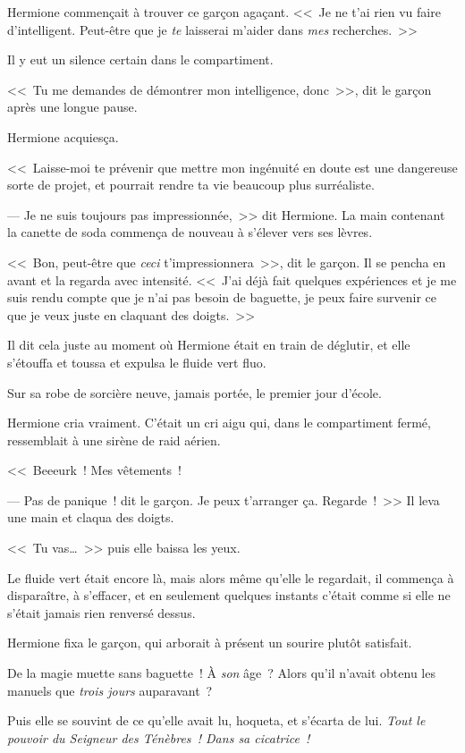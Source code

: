 Hermione commençait à trouver ce garçon agaçant. <<~Je ne t'ai rien vu faire d'intelligent. Peut-être que je \emph{te} laisserai m'aider dans \emph{mes} recherches.~>>

Il y eut un silence certain dans le compartiment.

<<~Tu me demandes de démontrer mon intelligence, donc~>>, dit le garçon après une longue pause.

Hermione acquiesça.

<<~Laisse-moi te prévenir que mettre mon ingénuité en doute est une dangereuse sorte de projet, et pourrait rendre ta vie beaucoup plus surréaliste.

--- Je ne suis toujours pas impressionnée,~>> dit Hermione. La main contenant la canette de soda commença de nouveau à s'élever vers ses lèvres.

<<~Bon, peut-être que \emph{ceci} t'impressionnera~>>, dit le garçon. Il se pencha en avant et la regarda avec intensité. <<~J'ai déjà fait quelques expériences et je me suis rendu compte que je n'ai pas besoin de baguette, je peux faire survenir ce que je veux juste en claquant des doigts.~>>

Il dit cela juste au moment où Hermione était en train de déglutir, et elle s'étouffa et toussa et expulsa le fluide vert fluo.

Sur sa robe de sorcière neuve, jamais portée, le premier jour d'école.

Hermione cria vraiment. C'était un cri aigu qui, dans le compartiment fermé, ressemblait à une sirène de raid aérien.

<<~Beeeurk~! Mes vêtements~!

--- Pas de panique~! dit le garçon. Je peux t'arranger ça. Regarde~!~>> Il leva une main et claqua des doigts.

<<~Tu vas…~>> puis elle baissa les yeux.

Le fluide vert était encore là, mais alors même qu'elle le regardait, il commença à disparaître, à s'effacer, et en seulement quelques instants c'était comme si elle ne s'était jamais rien renversé dessus.

Hermione fixa le garçon, qui arborait à présent un sourire plutôt satisfait.

De la magie muette sans baguette~! À \emph{son} âge~? Alors qu'il n'avait obtenu les manuels que \emph{trois jours} auparavant~?

Puis elle se souvint de ce qu'elle avait lu, hoqueta, et s'écarta de lui. \emph{Tout le pouvoir du Seigneur des Ténèbres~! Dans sa cicatrice~!}

